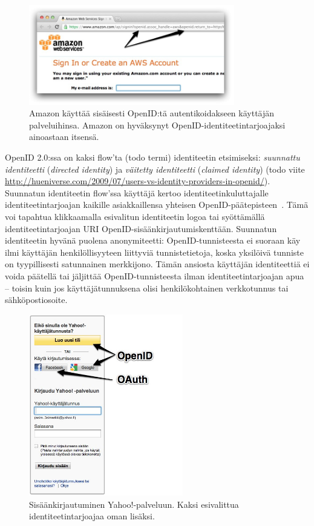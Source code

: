 \documentclass[finnish,gradu]{tktltiki}
\begin{document}
  \begin{figure}
    \centering
    \includegraphics[width=0.8\textwidth]{images/amazon_openid.jpg}
    \caption{Amazon käyttää sisäisesti OpenID:tä autentikoidakseen käyttäjän palveluihinsa. Amazon on hyväksynyt  OpenID-identiteetintarjoajaksi ainoastaan itsensä.}
    \label{fig:amazon_openid}
  \end{figure}


  OpenID 2.0:ssa on kaksi flow'ta (todo termi) identiteetin etsimiseksi: \emph{suunnattu identiteetti}  (\emph{directed identity}) ja \emph{väitetty identiteetti} (\emph{claimed identity}) (todo viite \url{http://hueniverse.com/2009/07/users-vs-identity-providers-in-openid/}). Suunnatun identiteetin flow'ssa käyttäjä kertoo identiteetinkuluttajalle identiteetintarjoajan kaikille asiakkaillensa yhteisen OpenID-päätepisteen~\cite{openid_discovery_recordon_2008}. Tämä voi tapahtua klikkaamalla esivalitun identiteetin logoa tai syöttämällä identiteetintarjoajan URI OpenID-sisäänkirjautumiskenttään. Suunnatun identiteetin hyvänä puolena anonymiteetti: OpenID-tunnisteesta ei suoraan käy ilmi käyttäjän henkilöllisyyteen liittyviä tunnistetietoja, koska yksilöivä tunniste on tyypillisesti satunnainen merkkijono. Tämän ansiosta käyttäjän identiteettiä ei voida päätellä tai jäljittää OpenID-tunnisteesta ilman identiteetintarjoajan apua -- toisin kuin jos käyttäjätunnuksena olisi henkilökohtainen verkkotunnus tai sähköpostiosoite.

  \begin{figure}[h!]
    \centering
    \includegraphics[width=0.6\textwidth]{images/yahoo_login.jpg}
    \caption{Sisäänkirjautuminen Yahoo!-palveluun. Kaksi esivalittua identiteetintarjoajaa oman lisäksi.}
    \label{fig:yahoo_login}
  \end{figure}
\end{document}

